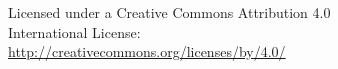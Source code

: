 \documentclass[25pt, a0paper, portrait]{tikzposter}
\begin{document}
\begin{columns}
{
Licensed under a Creative Commons Attribution 4.0 \\
International License: \\
\url{http://creativecommons.org/licenses/by/4.0/}
}

\end{columns}









\end{document}
